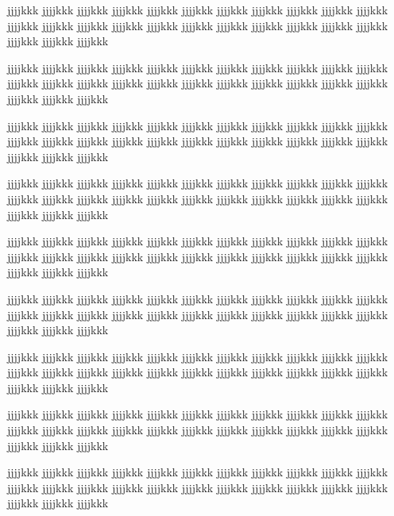 jjjjkkk jjjjkkk jjjjkkk jjjjkkk jjjjkkk jjjjkkk jjjjkkk jjjjkkk jjjjkkk jjjjkkk jjjjkkk jjjjkkk jjjjkkk jjjjkkk jjjjkkk jjjjkkk jjjjkkk jjjjkkk jjjjkkk jjjjkkk jjjjkkk jjjjkkk jjjjkkk jjjjkkk jjjjkkk

jjjjkkk jjjjkkk jjjjkkk jjjjkkk jjjjkkk jjjjkkk jjjjkkk jjjjkkk jjjjkkk jjjjkkk jjjjkkk jjjjkkk jjjjkkk jjjjkkk jjjjkkk jjjjkkk jjjjkkk jjjjkkk jjjjkkk jjjjkkk jjjjkkk jjjjkkk jjjjkkk jjjjkkk jjjjkkk

jjjjkkk jjjjkkk jjjjkkk jjjjkkk jjjjkkk jjjjkkk jjjjkkk jjjjkkk jjjjkkk jjjjkkk jjjjkkk jjjjkkk jjjjkkk jjjjkkk jjjjkkk jjjjkkk jjjjkkk jjjjkkk jjjjkkk jjjjkkk jjjjkkk jjjjkkk jjjjkkk jjjjkkk jjjjkkk

jjjjkkk jjjjkkk jjjjkkk jjjjkkk jjjjkkk jjjjkkk jjjjkkk jjjjkkk jjjjkkk jjjjkkk jjjjkkk jjjjkkk jjjjkkk jjjjkkk jjjjkkk jjjjkkk jjjjkkk jjjjkkk jjjjkkk jjjjkkk jjjjkkk jjjjkkk jjjjkkk jjjjkkk jjjjkkk

jjjjkkk jjjjkkk jjjjkkk jjjjkkk jjjjkkk jjjjkkk jjjjkkk jjjjkkk jjjjkkk jjjjkkk jjjjkkk jjjjkkk jjjjkkk jjjjkkk jjjjkkk jjjjkkk jjjjkkk jjjjkkk jjjjkkk jjjjkkk jjjjkkk jjjjkkk jjjjkkk jjjjkkk jjjjkkk

jjjjkkk jjjjkkk jjjjkkk jjjjkkk jjjjkkk jjjjkkk jjjjkkk jjjjkkk jjjjkkk jjjjkkk jjjjkkk jjjjkkk jjjjkkk jjjjkkk jjjjkkk jjjjkkk jjjjkkk jjjjkkk jjjjkkk jjjjkkk jjjjkkk jjjjkkk jjjjkkk jjjjkkk jjjjkkk

jjjjkkk jjjjkkk jjjjkkk jjjjkkk jjjjkkk jjjjkkk jjjjkkk jjjjkkk jjjjkkk jjjjkkk jjjjkkk jjjjkkk jjjjkkk jjjjkkk jjjjkkk jjjjkkk jjjjkkk jjjjkkk jjjjkkk jjjjkkk jjjjkkk jjjjkkk jjjjkkk jjjjkkk jjjjkkk

jjjjkkk jjjjkkk jjjjkkk jjjjkkk jjjjkkk jjjjkkk jjjjkkk jjjjkkk jjjjkkk jjjjkkk jjjjkkk jjjjkkk jjjjkkk jjjjkkk jjjjkkk jjjjkkk jjjjkkk jjjjkkk jjjjkkk jjjjkkk jjjjkkk jjjjkkk jjjjkkk jjjjkkk jjjjkkk

jjjjkkk jjjjkkk jjjjkkk jjjjkkk jjjjkkk jjjjkkk jjjjkkk jjjjkkk jjjjkkk jjjjkkk jjjjkkk jjjjkkk jjjjkkk jjjjkkk jjjjkkk jjjjkkk jjjjkkk jjjjkkk jjjjkkk jjjjkkk jjjjkkk jjjjkkk jjjjkkk jjjjkkk jjjjkkk

